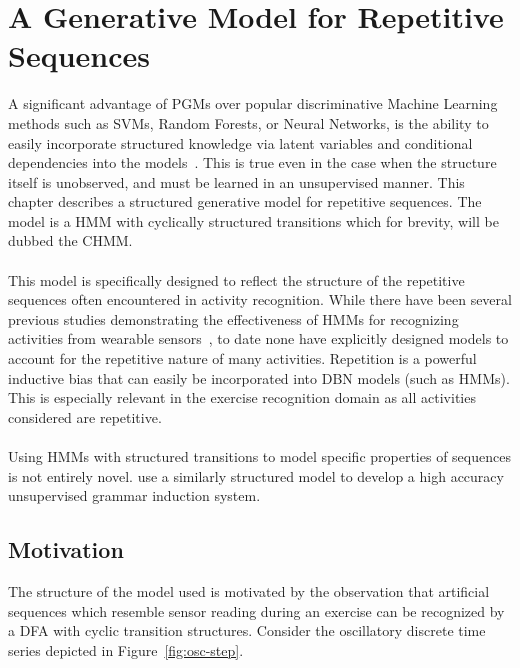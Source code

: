 \documentclass[12pt]{report}
\newcommand{\1}[0]{\mathbbm{1}}
\begin{document}
\chapter{A Generative Model for Repetitive Sequences}
\label{chap: A Generative Model for Repetitive Sequences}
A significant advantage of \acp{PGM} over popular discriminative Machine Learning methods
such as \acp{SVM}, Random Forests, or Neural Networks, is the ability to easily incorporate
structured knowledge via latent variables and conditional dependencies into the
models~\cite{structured-priors,poverty-stimulus,how-to-grow-a-mind}.
This is true even in the case when the structure itself is unobserved, and must
be learned in an unsupervised manner. This chapter describes a structured generative model for
repetitive sequences. The model is a \ac{HMM} with cyclically structured transitions which
for brevity, will be dubbed the \ac{CHMM}.
\\\\
This model is specifically designed to reflect the structure of the repetitive sequences
often encountered in activity recognition. While there have been several previous studies demonstrating
the effectiveness of \acp{HMM} for recognizing activities from wearable sensors~\cite{hhmm-lee,factored-hmm-tran},
to date none have explicitly designed models to account for the repetitive nature
of many activities. Repetition is a powerful inductive bias that can easily be incorporated into
\ac{DBN} models (such as \acp{HMM}). This is especially relevant in the exercise recognition
domain as all activities considered are repetitive.
\\\\
Using \ac{HMM}s with structured transitions to model specific properties of sequences is
not entirely novel. \cite{cascaded-finite-state} use a similarly structured model to develop
a high accuracy unsupervised grammar induction system.

\section{Motivation}
The structure of the model used is motivated by the observation that artificial
sequences which resemble sensor reading during an exercise can be recognized by a \ac{DFA}
with cyclic transition structures. Consider the oscillatory discrete time series depicted
in Figure~\ref{fig:osc-step}.
\end{document}
